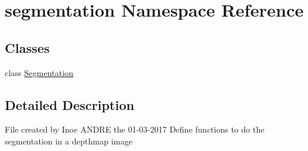 \hypertarget{namespacesegmentation}{}\section{segmentation Namespace Reference}
\label{namespacesegmentation}
\subsection*{Classes}
\begin{DoxyCompactItemize}
\item 
class \hyperlink{classsegmentation_1_1_segmentation}{Segmentation}
\end{DoxyCompactItemize}


\subsection{Detailed Description}
\begin{DoxyVerb}File created by Inoe ANDRE the 01-03-2017
Define functions to do the segmentation in a depthmap image
\end{DoxyVerb}
 